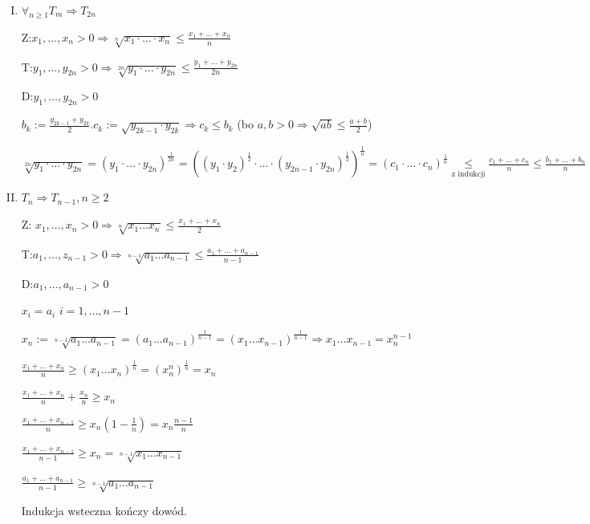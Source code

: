 \documentclass[12pt,a4paper]{article}
\theoremstyle{break}
\begin{document}
\begin{enumerate}[1.]
{\begin{enumerate}[I)]
			$L=a_1$ $P=a_1$ ok
			
			\item $\forall_{n\geq 1} T_m\Rightarrow T_{2n}$
			
			Z:$x_1,\dots,x_n >0 \Rightarrow \sqrt[n]{x_1\cdot \dots \cdot x_n}\leq \frac{x_1+\dots+x_n}{n}$
			
			T:$y_1,\dots,y_{2n} >0 \Rightarrow \sqrt[2n]{y_1\cdot \dots \cdot y_{2n}}\leq \frac{y_1+\dots+y_{2n}}{2n}$
			
			D:$y_1,\dots,y_{2n}>0$
			
			$b_k:=\frac{y_{2k-1}+y_{2k}}{2}. c_k:=\sqrt{y_{2k-1}\cdot y_{2k}} \Rightarrow c_k\leq b_k$ (bo $a,b>0\Rightarrow \sqrt{ab}\leq \frac{a+b}{2}$)
			
			$\sqrt[2n]{y_1 \cdot \dots \cdot y_{2n}}=(y_1 \cdot \dots \cdot y_{2n})^\frac{1}{2n}=((y_1\cdot y_2)^\frac{1}{2}\cdot \dots \cdot (y_{2n-1}\cdot y_{2n})^\frac{1}{2})^\frac{1}{n}=(c_1\cdot \dots \cdot c_n)^\frac{1}{n}\underset{\text{z indukcji}}{\leq} \frac{c_1+\dots+c_n}{n}
			\leq \frac{b_1+\dots+b_n}{n}=\frac{y_1+\dots+y_{2n}}{2n}$
			
			\item $T_n\Rightarrow T_{n-1}, n\geq 2$
			
			Z: $x_1,\dots,x_n>0 \Rightarrow \sqrt[n]{x_1\dots x_n}\leq \frac{x_1+\dots+x_n}{2}$
			
			T:$a_1,\dots,z_{n-1}>0 \Rightarrow \sqrt[n-1]{a_1\dots a_{n-1}}\leq \frac{a_1+\dots+a_{n-1}}{n-1}$
				
			D:$a_1,\dots,a_{n-1}>0$
			
			$x_i=a_i$ $i=1,\dots,n-1$
			
			$x_n:=\sqrt[n-1]{a_1\dots a_{n-1}}=(a_1\dots a_{n-1})^\frac{1}{n-1}=(x_1\dots x_{n-1})^\frac{1}{n-1}\Rightarrow x_1\dots x_{n-1}=x_n^{n-1}$
			
			$\frac{x_1+\dots+x_n}{n}\geq (x_1\dots x_n)^\frac{1}{n}=(x_n^n)^{\frac{1}{n}}=x_n$
			
			$\frac{x_1+\dots+x_n}{n}+\frac{x_n}{n}\geq x_n$
			
			$\frac{x_1+\dots+x_{n-1}}{n}\geq x_n(1-\frac{1}{n})=x_n\frac{n-1}{n}$
			
			$\frac{x_1+\dots+x_{n-1}}{n-1}\geq x_n = \sqrt[n-1]{x_1\dots x_{n-1}}$
			
			$\frac{a_1+\dots+a_{n-1}}{n-1}\geq\sqrt[n-1]{a_1\dots a_{n-1}}$
			
			Indukcja wsteczna kończy dowód.
		\end{enumerate}
	}
	

\end{enumerate}
\end{document}
